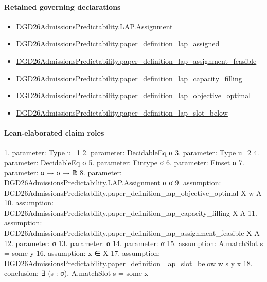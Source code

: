 \documentclass[10pt]{article}
\begin{document}
\paragraph{Retained governing declarations}
\begin{itemize}\raggedright
\item \hyperlink{governing-declaration-a9620f375b9ffc53}{DGD26\allowbreak{}Admissions\allowbreak{}Predictability.\allowbreak{}LAP.\allowbreak{}Assignment}
\item \hyperlink{governing-declaration-83905204490bb8ac}{DGD26\allowbreak{}Admissions\allowbreak{}Predictability.\allowbreak{}paper\_\allowbreak{}definition\_\allowbreak{}lap\_\allowbreak{}assigned}
\item \hyperlink{governing-declaration-478232d5e3e1f600}{DGD26\allowbreak{}Admissions\allowbreak{}Predictability.\allowbreak{}paper\_\allowbreak{}definition\_\allowbreak{}lap\_\allowbreak{}assignment\_\allowbreak{}feasible}
\item \hyperlink{governing-declaration-db7390a880816db6}{DGD26\allowbreak{}Admissions\allowbreak{}Predictability.\allowbreak{}paper\_\allowbreak{}definition\_\allowbreak{}lap\_\allowbreak{}capacity\_\allowbreak{}filling}
\item \hyperlink{governing-declaration-d72eb6c77e7e8078}{DGD26\allowbreak{}Admissions\allowbreak{}Predictability.\allowbreak{}paper\_\allowbreak{}definition\_\allowbreak{}lap\_\allowbreak{}objective\_\allowbreak{}optimal}
\item \hyperlink{governing-declaration-819a29e3367c47ca}{DGD26\allowbreak{}Admissions\allowbreak{}Predictability.\allowbreak{}paper\_\allowbreak{}definition\_\allowbreak{}lap\_\allowbreak{}slot\_\allowbreak{}below}
\end{itemize}
\paragraph{Lean-elaborated claim roles}\begin{ReviewVerbatim}
1. parameter: Type u_1
2. parameter: DecidableEq α
3. parameter: Type u_2
4. parameter: DecidableEq σ
5. parameter: Fintype σ
6. parameter: Finset α
7. parameter: α → σ → ℝ
8. parameter: DGD26AdmissionsPredictability.LAP.Assignment α σ
9. assumption: DGD26AdmissionsPredictability.paper_definition_lap_objective_optimal X w A
10. assumption: DGD26AdmissionsPredictability.paper_definition_lap_capacity_filling X A
11. assumption: DGD26AdmissionsPredictability.paper_definition_lap_assignment_feasible X A
12. parameter: σ
13. parameter: α
14. parameter: α
15. assumption: A.matchSlot s = some y
16. assumption: x ∈ X
17. assumption: DGD26AdmissionsPredictability.paper_definition_lap_slot_below w s y x
18. conclusion: ∃ (s : σ), A.matchSlot s = some x
\end{ReviewVerbatim}
\end{document}
